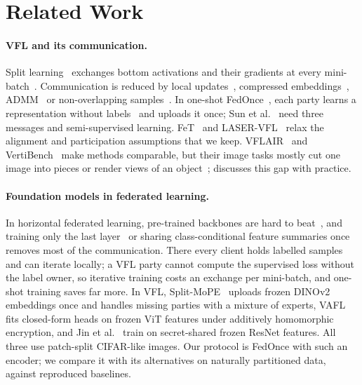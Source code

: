 \section{Related Work}\label{sec:related}

\paragraph{VFL and its communication.}
Split learning~\cite{vepakomma2018splitnn} exchanges bottom activations and their gradients at every mini-batch~\cite{liu2024vfl}. Communication is reduced by local updates~\cite{liu2022fedbcd}, compressed embeddings~\cite{castiglia2022cvfl}, ADMM~\cite{xie2024vimadmm} or non-overlapping samples~\cite{kang2022fedcvt}. In one-shot FedOnce~\cite{wu2022fedonce}, each party learns a representation without labels~\cite{bojanowski2017nat} and uploads it once; Sun et al.~\cite{sun2023oneshotvfl} need three messages and semi-supervised learning. FeT~\cite{wu2024fet} and LASER-VFL~\cite{valdeira2025laser} relax the alignment and participation assumptions that we keep. VFLAIR~\cite{zou2024vflair} and VertiBench~\cite{wu2024vertibench} make methods comparable, but their image tasks mostly cut one image into pieces or render views of an object~\cite{wu2015modelnet,su2015mvcnn}; \cite{wu2025vflpractice} discusses this gap with practice.

\paragraph{Foundation models in federated learning.}
In horizontal federated learning, pre-trained backbones are hard to beat~\cite{nguyen2023where,hu2023flimages}, and training only the last layer~\cite{legate2023guiding} or sharing class-conditional feature summaries once~\cite{beitollahi2024fedpft} removes most of the communication. There every client holds labelled samples and can iterate locally; a VFL party cannot compute the supervised loss without the label owner, so iterative training costs an exchange per mini-batch, and one-shot training saves far more. In VFL, Split-MoPE~\cite{irureta2026splitmope} uploads frozen DINOv2 embeddings once and handles missing parties with a mixture of experts, VAFL~\cite{huang2026vafl} fits closed-form heads on frozen ViT features under additively homomorphic encryption, and Jin et al.~\cite{jin2026secure} train on secret-shared frozen ResNet features. All three use patch-split CIFAR-like images. Our protocol is FedOnce with such an encoder; we compare it with its alternatives on naturally partitioned data, against reproduced baselines.

